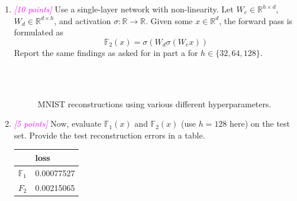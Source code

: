 \documentclass{article}
\newcommand{\field}[1]{\mathbb{#1}}
\newcommand{\1}{\mathbf{1}}
\newcommand{\R}{\field{R}} %
\newcommand{\F}{\field{F}} %
\newcommand{\points}[1]{\small\textcolor{magenta}{\emph{[#1 points]}} \normalsize}
\begin{document}
\begin{enumerate}
    
    \newpage
    \item \points{10} Use a single-layer network with non-linearity. Let $W_e\in\R^{h\times d}$,$W_d\in\R^{d\times h}$, and activation $\sigma:\R\rightarrow\R$. Given some $x\in\R^d$, the forward pass is formulated as 
    $$\F_2(x) = \sigma(W_d\sigma(W_ex))$$
    Report the same findings as asked for in part a for $h\in\{32,64,128\}$.
    \begin{figure}[h!]
        \centering 
        \\
        \\
        \caption{MNIST reconstructions using various different hyperparameters.}
    \end{figure}
    
    
    \item \points{5} Now, evaluate $\F_1(x)$ and $\F_2(x)$ (use $h=128$ here) on the test set. Provide the test reconstruction errors in a table.
    \begin{table}[h!]
    \centering
        \begin{tabular}{l|l}
               &  loss   \\
        \hline 
        $\F_1$ &  0.00077527 \\
        \hline 
        $F_2$  & 0.00215065   
        \end{tabular}
    \end{table}
    

\end{enumerate}
\end{document}
